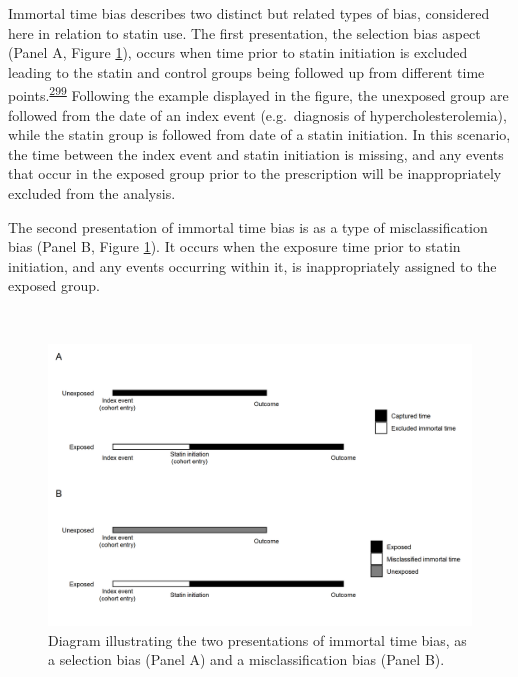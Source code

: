 \documentclass[a4paper, twoside]{templates/ociamthesis}
\begin{document}
Immortal time bias describes two distinct but related types of bias, considered here in relation to statin use. The first presentation, the selection bias aspect (Panel A, Figure \ref{fig:immortalTimeBias}), occurs when time prior to statin initiation is excluded leading to the statin and control groups being followed up from different time points.\textsuperscript{\protect\hyperlink{ref-levesque2010}{299}} Following the example displayed in the figure, the unexposed group are followed from the date of an index event (e.g.~diagnosis of hypercholesterolemia), while the statin group is followed from date of a statin initiation. In this scenario, the time between the index event and statin initiation is missing, and any events that occur in the exposed group prior to the prescription will be inappropriately excluded from the analysis.

The second presentation of immortal time bias is as a type of misclassification bias (Panel B, Figure \ref{fig:immortalTimeBias}). It occurs when the exposure time prior to statin initiation, and any events occurring within it, is inappropriately assigned to the exposed group.

~





\begin{figure}[H]
\includegraphics[width=1\linewidth]{figures/cprd-analysis/immortal_time} \caption[shortcap]{Diagram illustrating the two presentations of immortal time bias, as a selection bias (Panel A) and a misclassification bias (Panel B).}\label{fig:immortalTimeBias}
\end{figure}

~
\end{document}
